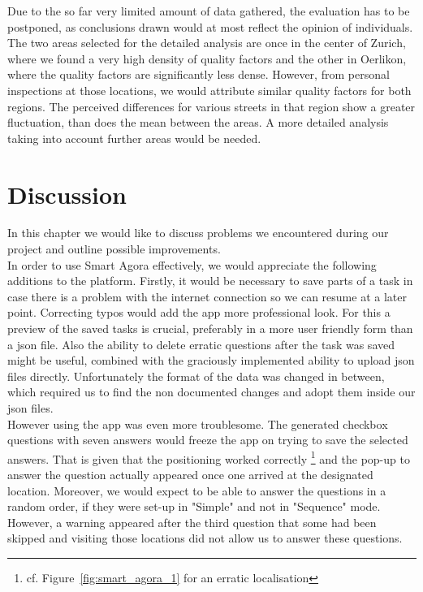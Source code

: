\documentclass[letterpaper]{article}
\newcommand{\mypar}[1]{{\bf #1.}}
\begin{document}
\indent Due to the so far very limited amount of data gathered, the evaluation has to be postponed, as conclusions drawn would at most reflect the opinion of individuals. The two areas selected for the detailed analysis are once in the center of Zurich, where we found a very high density of quality factors and the other in Oerlikon, where the quality factors are significantly less dense. However, from personal inspections at those locations, we would attribute similar quality factors for both regions. The perceived differences for various streets in that region show a greater fluctuation, than does the mean between the areas. A more detailed analysis taking into account further areas would be needed.

\section{Discussion}\label{sec:discussion}
In this chapter we would like to discuss problems we encountered during our project and outline possible improvements.
\\
\indent \mypar{Smart Agora}
In order to use Smart Agora effectively, we would appreciate the following additions to the platform. Firstly,
it would be necessary to save parts of a task in case there is a problem with the internet connection
so we can resume at a later point. Correcting typos would add the app more professional look. For this a preview of the saved tasks is crucial,
preferably in a more user friendly form than a json file. Also the ability to delete erratic questions after the task was saved
might be useful, combined with the graciously implemented ability to upload json files directly. Unfortunately the format
of the data was changed in between, which required us to find the non documented changes and adopt them inside our json files.\\
\indent However using the app was even more troublesome. The generated checkbox questions with seven answers would freeze
the app on trying to save the selected answers. That is given that the positioning worked correctly
\footnote{cf. Figure~\ref{fig:smart_agora_1} for an erratic localisation} and the pop-up to answer the question actually
appeared once one arrived at the designated location. Moreover, we would expect to be able to answer the questions in a random order,
if they were set-up in "Simple" and not in "Sequence" mode. However, a warning appeared after the third question that some had been skipped
and visiting those locations did not allow us to answer these questions.\\
\end{document}
